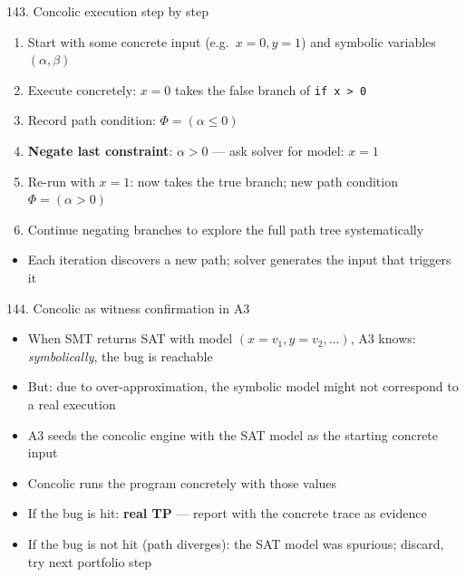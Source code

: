 \documentclass[aspectratio=169]{beamer}
\begin{document}
\begin{frame}[fragile]{143. Concolic execution step by step}
\begin{enumerate}
  \item Start with some concrete input (e.g.\ \(x=0, y=1\)) and symbolic variables \((\alpha, \beta)\)
  \item Execute concretely: \(x=0\) takes the false branch of \texttt{if x > 0}
  \item Record path condition: \(\Phi = (\alpha \le 0)\)
  \item \textbf{Negate last constraint}: \(\alpha > 0\) --- ask solver for model: \(x = 1\)
  \item Re-run with \(x=1\): now takes the true branch; new path condition \(\Phi = (\alpha > 0)\)
  \item Continue negating branches to explore the full path tree systematically
\end{enumerate}
\begin{itemize}
  \item Each iteration discovers a new path; solver generates the input that triggers it
\end{itemize}
\end{frame}

\begin{frame}{144. Concolic as witness confirmation in A3}
\begin{itemize}
  \item When SMT returns SAT with model \((x=v_1, y=v_2, \ldots)\), A3 knows: \emph{symbolically}, the bug is reachable
  \item But: due to over-approximation, the symbolic model might not correspond to a real execution
  \item A3 seeds the concolic engine with the SAT model as the starting concrete input
  \item Concolic runs the program concretely with those values
  \item If the bug is hit: \textbf{real TP} --- report with the concrete trace as evidence
  \item If the bug is not hit (path diverges): the SAT model was spurious; discard, try next portfolio step
\end{itemize}
\end{frame}
\end{document}
